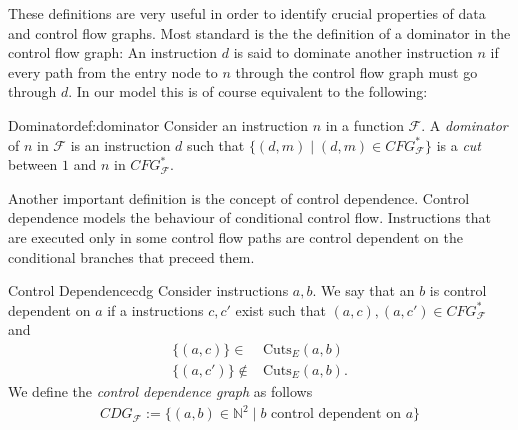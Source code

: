     These definitions are very useful in order to identify crucial properties of
    data and control flow graphs.
    Most standard is the the definition of a dominator in the control flow
    graph: An instruction $d$ is said to dominate another instruction $n$ if
    every path from the entry node to $n$ through the control flow graph must
    go through $d$.
    In our model this is of course equivalent to the following:

    \begin{definition}{Dominator}{def:dominator}
        Consider an instruction $n$ in a function $\mathcal F$.
        A {\em dominator} of $n$ in $\mathcal{F}$ is an instruction $d$ such
        that $\{(d,m)\mid(d,m)\in CFG_\mathcal{F}^*\}$ is a {\em cut} between $1$ and $n$ in $CFG_\mathcal{F}^*$.
    \end{definition}

    Another important definition is the concept of control dependence.
    Control dependence models the behaviour of conditional control flow.
    Instructions that are executed only in some control flow paths are control
    dependent on the conditional branches that preceed them.

    \begin{definition}{Control Dependence}{cdg}
        Consider instructions $a,b$.
        We say that an $b$ is control dependent on $a$ if a instructions
        $c,c'$ exist such that $(a,c),(a,c')\in CFG_\mathcal{F}^*$ and
        \begin{align*}
            \{(a,c)\}\in{}&{}\text{Cuts}_E(a,b)\\
            \{(a,c')\}\notin{}&{}\text{Cuts}_E(a,b)\text{.}
        \end{align*}
        We define the {\em control dependence graph} as follows
        \begin{align*}
            CDG_\mathcal{F}:=\{(a,b)\in\mathbb{N}^2\mid b\text{ control dependent on }a\}
        \end{align*}
    \end{definition}

